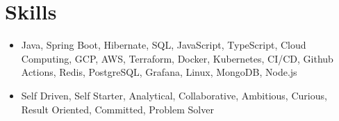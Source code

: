 \section{Skills}
\begin{itemize}
  \item Java, Spring Boot, Hibernate, SQL, JavaScript, TypeScript, Cloud Computing, GCP, AWS, Terraform, Docker, Kubernetes, CI/CD, Github Actions, Redis, PostgreSQL, Grafana, Linux, MongoDB, Node.js
  \item Self Driven, Self Starter, Analytical, Collaborative, Ambitious, Curious, Result Oriented, Committed, Problem Solver
\end{itemize}
